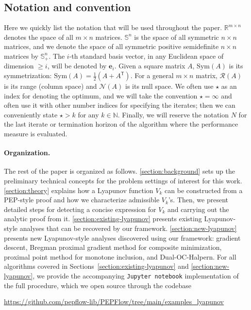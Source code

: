 \documentclass{article}
\theoremstyle{definition}
\theoremstyle{plain}
\newcommand{\ve}{{\mathbf{e}}}
\newcommand{\cN}{{\mathcal{N}}}
\newcommand{\cR}{{\mathcal{R}}}
\newcommand{\reals}{\mathbb{R}}
\newcommand{\transpose}{\mathsf{T}}
\begin{document}
\subsection{Notation and convention}

Here we quickly list the notation that will be used throughout the paper. 
$\reals^{m\times n}$ denotes the space of all $m\times n$ matrices.
$\mathbb{S}^n$ is the space of all symmetric $n\times n$ matrices, and we denote the space of all symmetric positive semidefinite $n\times n$ matrices by $\mathbb{S}_+^n$.
The $i$-th standard basis vector, in any Euclidean space of dimension $\ge i$, will be denoted by $\ve_i$.
Given a square matrix $A$, $\mathrm{Sym}(A)$ is its symmetrization: $\mathrm{Sym}(A) = \frac{1}{2}(A + A^\transpose)$.
For a general $m\times n$ matrix, $\cR (A)$ is its range (column space) and $\cN (A)$ is its null space.
We often use $\star$ as an index for denoting the optimum, and we will take the convention $\star=\infty$ and often use it with other number indices for specifying the iterates;
then we can conveniently state $\star > k$ for any $k\in \mathbb{N}$.
Finally, we will reserve the notation $N$ for the last iterate or termination horizon of the algorithm where the performance measure is evaluated.


\paragraph{Organization.}
The rest of the paper is organized as follows. 
\cref{section:background} sets up the preliminary technical concepts for the problem settings of interest for this work.
\cref{section:theory} explains how a Lyapunov function $V_k$ can be constructed from a PEP-style proof and how we characterize admissible $V_k$'s.
Then, we present detailed steps for detecting a concise expression for $V_k$ and carrying out the analytic proof from it.
\cref{section:existing-lyapunov} presents existing Lyapunov-style analyses that can be recovered by our framework.
\cref{section:new-lyapunov} presents new Lyapunov-style analyses discovered using our framework: gradient descent, Bregman proximal gradient method for composite minimization, proximal point method for monotone inclusion, and Dual-OC-Halpern.
For all algorithms covered in Sections~\ref{section:existing-lyapunov} and \ref{section:new-lyapunov}, we provide the accompanying \texttt{Jupyter notebook} implementation of the full procedure, which we open source through the codebase
{\color{blue}
\begin{center}
    \url{https://github.com/pepflow-lib/PEPFlow/tree/main/examples_lyapunov} 
\end{center}}
\end{document}
